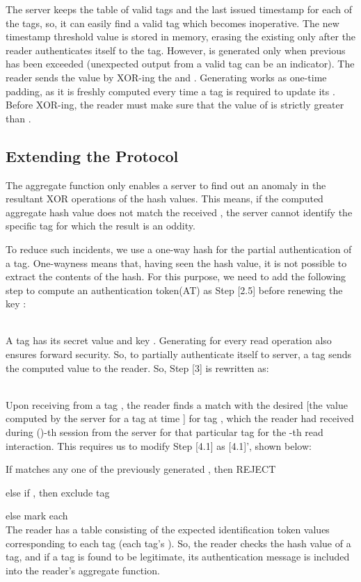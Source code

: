 \documentclass{easychair}
\begin{document}
The server keeps the table of valid tags and the last issued timestamp 
 for each of the tags, so, it can easily find a valid tag which 
becomes inoperative. The new timestamp threshold value  is 
stored in memory, erasing the existing  only after the reader 
authenticates itself to the tag. However,  is generated only when previous  has been exceeded (unexpected output from a valid tag can be an 
indicator). The reader sends the 
value  by XOR-ing the  and . Generating 
 works as one-time padding, as it is freshly computed every 
time a tag is required to update its . Before XOR-ing, the reader must make sure 
that the value of  is strictly greater than . 



\subsection{Extending the Protocol}

The aggregate function only enables a server to find out an anomaly in the 
resultant XOR operations of the hash values. This means, if the computed 
aggregate hash value does not match the received , the server cannot 
identify the specific tag for which the result is an oddity.

To reduce such incidents, we use a one-way hash for the partial authentication 
of a tag. One-wayness means that, having seen the hash value, it is not possible 
to extract the contents of the hash. For this purpose, we need to add the 
following step to compute an authentication token(AT) as Step [2.5] before 
renewing the key :

\\
A tag  has its secret value  and key . Generating  
for every read operation also ensures forward security. So, to partially 
authenticate itself to server, a tag sends the computed  value to 
the reader. So, Step [3] is rewritten as:

\\
Upon receiving  from a tag , the reader finds a match
with the desired  [the value  computed by the server for a tag 
 at time ] for tag , which the reader had received during ()-th session from the server for that particular tag  for the -th read interaction. 
This requires us to modify Step [4.1] as [4.1]', shown below:

 If  matches any one of the previously generated , 
then REJECT

else if , then exclude tag 

else mark each \\
The reader has a table consisting of the expected identification token 
 values corresponding to each tag (each tag's ). So, the 
reader checks the hash value of a tag, and if a tag is found to be legitimate, its 
authentication message is included into the reader's aggregate function.
\end{document}
